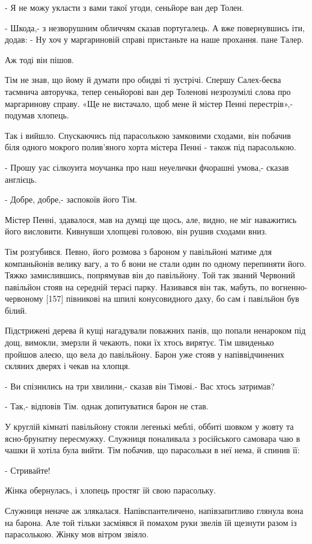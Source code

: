 - Я не можу укласти з вами такої угоди, сеньйоре ван дер Толен.

- Шкода,- з незворушним обличчям сказав португалець. А вже повернувшись іти, додав: - Ну хоч у маргариновій справі пристаньте на наше прохання. пане Талер.

Аж тоді він пішов.

Тім не знав, що йому й думати про обидві ті зустрічі. Спершу Салех-беєва таємнича авторучка, тепер сеньйорові ван дер Толенові незрозумілі слова про маргаринову справу. «Ще не вистачало, щоб мене й містер Пенні перестрів»,- подумав хлопець.

Так і вийшло. Спускаючись під парасолькою замковими сходами, він побачив біля одного мокрого полив'яного хорта містера Пенні - також під парасолькою.

- Прошу уас сілкоуита моучанка про наш неуелички фчорашні умова,- сказав англієць.

- Добре, добре,- заспокоїв його Тім.

Містер Пенні, здавалося, мав на думці ще щось, але, видно, не міг наважитись його висловити. Кивнувши хлопцеві головою, він рушив сходами вниз.

Тім розгубився. Певно, його розмова з бароном у павільйоні матиме для компаньйонів велику вагу, а то б вони не стали один по одному перепиняти його. Тяжко замислившись, попрямував він до павільйону. Той так званий Червоний павільйон стояв на середній терасі парку. Називався він так, мабуть, по вогненно-червоному [157] півникові на шпилі конусовидного даху, бо сам і павільйон був білий.

Підстрижені дерева й кущі нагадували поважних панів, що попали ненароком під дощ, вимокли, змерзли й чекають, поки їх хтось вирятує. Тім швиденько пройшов алеєю, що вела до павільйону. Барон уже стояв у напіввідчинених скляних дверях і чекав на хлопця.

- Ви спізнились на три хвилини,- сказав він Тімові.- Вас хтось затримав?

- Так,- відповів Тім. однак допитуватися барон не став.

У круглій кімнаті павільйону стояли легенькі меблі, оббиті шовком у жовту та ясно-брунатну пересмужку. Служниця поналивала з російського самовара чаю в чашки й хотіла була вийти. Тім побачив, що парасольки в неї нема, й спинив її:

- Стривайте!

Жінка обернулась, і хлопець простяг їй свою парасольку.

Служниця неначе аж злякалася. Напівспантеличено, напівзапитливо глянула вона на барона. Але той тільки засміявся й помахом руки звелів їй щезнути разом із парасолькою. Жінку мов вітром звіяло.

